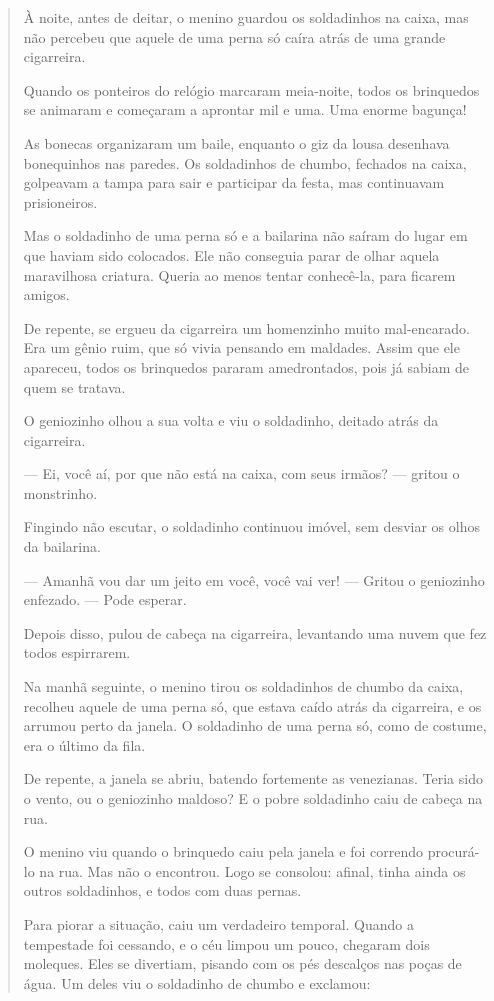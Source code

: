 \begin{quote}
À noite, antes de deitar, o menino guardou os soldadinhos na caixa, mas
não percebeu que aquele de uma perna só caíra atrás de uma grande
cigarreira.

Quando os ponteiros do relógio marcaram meia-noite, todos os brinquedos
se animaram e começaram a aprontar mil e uma. Uma enorme bagunça!

As bonecas organizaram um baile, enquanto o giz da lousa desenhava
bonequinhos nas paredes. Os soldadinhos de chumbo, fechados na caixa,
golpeavam a tampa para sair e participar da festa, mas continuavam
prisioneiros.

Mas o soldadinho de uma perna só e a bailarina não saíram do lugar em
que haviam sido colocados. Ele não conseguia parar de olhar aquela
maravilhosa criatura. Queria ao menos tentar conhecê-la, para ficarem
amigos.

De repente, se ergueu da cigarreira um homenzinho muito mal-encarado.
Era um gênio ruim, que só vivia pensando em maldades. Assim que ele
apareceu, todos os brinquedos pararam amedrontados, pois já sabiam de
quem se tratava.

O geniozinho olhou a sua volta e viu o soldadinho, deitado atrás da
cigarreira.

--- Ei, você aí, por que não está na caixa, com seus irmãos? --- gritou
o monstrinho.

Fingindo não escutar, o soldadinho continuou imóvel, sem desviar os
olhos da bailarina.

--- Amanhã vou dar um jeito em você, você vai ver! --- Gritou o geniozinho
enfezado. --- Pode esperar.

Depois disso, pulou de cabeça na cigarreira, levantando uma nuvem que
fez todos espirrarem.

Na manhã seguinte, o menino tirou os soldadinhos de chumbo da caixa,
recolheu aquele de uma perna só, que estava caído atrás da cigarreira, e
os arrumou perto da janela. O soldadinho de uma perna só, como de
costume, era o último da fila.

De repente, a janela se abriu, batendo fortemente as venezianas. Teria
sido o vento, ou o geniozinho maldoso? E o pobre soldadinho caiu de
cabeça na rua.

O menino viu quando o brinquedo caiu pela janela e foi correndo
procurá-lo na rua. Mas não o encontrou. Logo se consolou: afinal, tinha
ainda os outros soldadinhos, e todos com duas pernas.

Para piorar a situação, caiu um verdadeiro temporal. Quando a tempestade
foi cessando, e o céu limpou um pouco, chegaram dois moleques. Eles se
divertiam, pisando com os pés descalços nas poças de água. Um deles viu
o soldadinho de chumbo e exclamou:


\end{quote}
